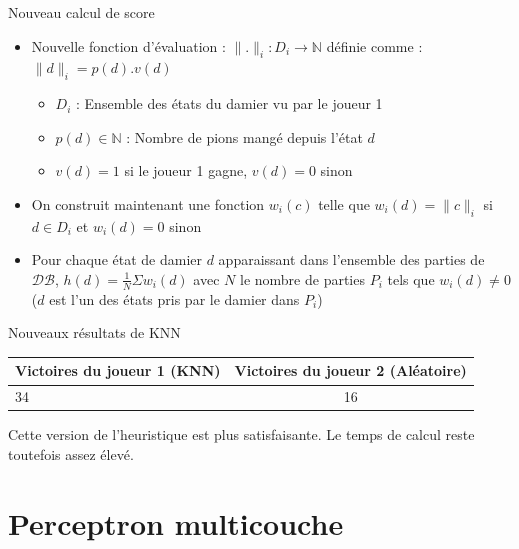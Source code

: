 \documentclass{beamer}
\begin{document}
\begin{frame}{Nouveau calcul de score}
    \begin{itemize}
        \item Nouvelle fonction d'évaluation : \newline
              $\lVert.\rVert_i : D_i \to \mathbb{N}$ définie comme : $\lVert d \rVert_i = p(d).v(d)$
              \begin{itemize}
                  \item $D_i$ : Ensemble des états du damier vu par le joueur 1
                  \item $p(d) \in \mathbb{N}$ : Nombre de pions mangé depuis l'état $d$
                  \item  $v(d) = 1$ si le joueur 1 gagne, $v(d) = 0$ sinon
              \end{itemize}
        \item On construit maintenant une fonction $w_i(c)$ telle que $w_i(d) = \lVert c \lVert_i$ si $d \in D_i$ et $w_i(d) = 0$ sinon
        \item Pour chaque état de damier $d$ apparaissant dans l'ensemble des parties de $\mathcal{DB}$, $h(d) = \frac{1}{N}\Sigma w_i(d)$ avec $N$ le nombre de parties $P_i$ tels que $w_i(d) \neq 0$ ($d$ est l'un des états pris par le damier dans $P_i$)
    \end{itemize}
\end{frame}

\begin{frame}{Nouveaux résultats de KNN}
    \begin{center}
        \begin{tabular}{ | l | c | }
            \hline
            Victoires du joueur 1 (KNN) & Victoires du joueur 2 (Aléatoire) \\ \hline
            34                          & 16                                \\ \hline
        \end{tabular}
    \end{center}
    Cette version de l'heuristique est plus satisfaisante. \newline
    Le temps de calcul reste toutefois assez élevé.
\end{frame}

{\section{Perceptron multicouche}}
\end{document}
